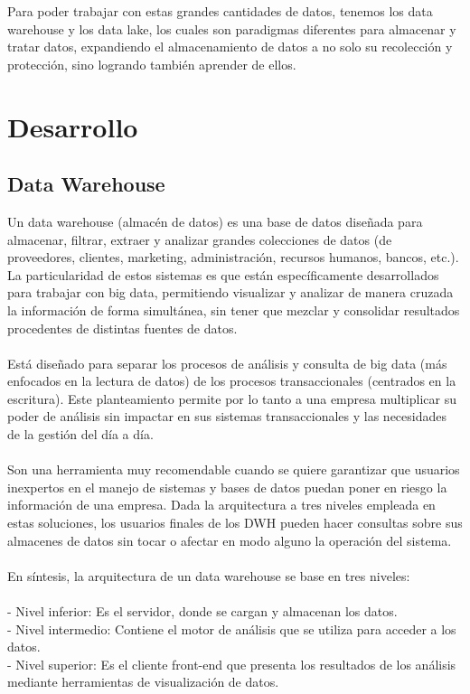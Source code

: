 \documentclass[11pt,twocolumn]{article}
\begin{document}
Para poder trabajar con estas grandes cantidades de datos, tenemos los data warehouse y los data lake, los cuales son paradigmas diferentes para almacenar y tratar datos, expandiendo el almacenamiento de datos a no solo su recolección y protección, sino logrando también aprender de ellos.

\section{Desarrollo}

\subsection{Data Warehouse}

Un data warehouse (almacén de datos) es una base de datos diseñada para almacenar, filtrar, extraer y analizar grandes colecciones de datos (de proveedores, clientes, marketing, administración, recursos humanos, bancos, etc.). La particularidad de estos sistemas es que están específicamente desarrollados para trabajar con big data, permitiendo visualizar y analizar de manera cruzada la información de forma simultánea, sin tener que mezclar y consolidar resultados procedentes de distintas fuentes de datos.
\\\\
Está diseñado para separar los procesos de análisis y consulta de big data (más enfocados en la lectura de datos) de los procesos transaccionales (centrados en la escritura). Este planteamiento permite por lo tanto a una empresa multiplicar su poder de análisis sin impactar en sus sistemas transaccionales y las necesidades de la gestión del día a día.
\\\\
Son una herramienta muy recomendable cuando se quiere garantizar que usuarios inexpertos en el manejo de sistemas y bases de datos puedan poner en riesgo la información de una empresa. Dada la arquitectura a tres niveles empleada en estas soluciones, los usuarios finales de los DWH pueden hacer consultas sobre sus almacenes de datos sin tocar o afectar en modo alguno la operación del sistema.
\\\\En síntesis, la arquitectura de un data warehouse se base en tres niveles:
 \\ \\{- Nivel inferior: Es el servidor, donde se cargan y almacenan los datos.}
 \\ {- Nivel intermedio: Contiene el motor de análisis que se utiliza para acceder a los datos.}
 \\ {- Nivel superior: Es el cliente front-end que presenta los resultados de los análisis mediante herramientas de visualización de datos.}
 
\end{document}
